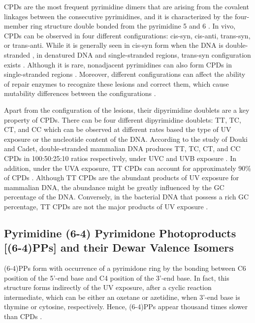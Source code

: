 CPDs are the most frequent pyrimidine dimers that are arising from the covalent linkages between the consecutive pyrimidines, and it is characterized by the four-member ring structure double bonded from the pyrimidine 5 and 6 \citep{whitmore2001effect}. In vivo, CPDs can be observed in four different configurations: cis-syn, cis-anti, trans-syn, or trans-anti. \citep{khattak1972photochemical} While it is generally seen in cis-syn form when the DNA is double-stranded \citep{wacker1964organic}, in denatured DNA and single-stranded regions, trans-syn configuration exists \citep{taylor1988synthesis}. Although it is rare, nonadjacent pyrimidines can also form CPDs in single-stranded regions \citep{nguyen1988ultraviolet}. Moreover, different configurations can affect the ability of repair enzymes to recognize these lesions and correct them, which cause mutability differences between the configurations \citep{friedberg2005dna}. 

Apart from the configuration of the lesions, their dipyrimidine doublets are a key property of CPDs. There can be four different dipyrimidine doublets: TT, TC, CT, and CC which can be observed at different rates based the type of UV exposure or the nucleotide content of the DNA. According to the study of Douki and Cadet, double-stranded mammalian DNA produces TT, TC, CT, and CC CPDs in 100:50:25:10 ratios respectively, under UVC and UVB exposure \citep{douki2001individual}. In addition, under the UVA exposure, TT CPDs can account for approximately 90\% of CPDs \citep{mouret2010uva}. Although TT CPDs are the abundant products of UV exposure for mammalian DNA, the abundance might be greatly influenced by the GC percentage of the DNA. Conversely, in the bacterial DNA that possess a rich GC percentage, TT CPDs are not the major products of UV exposure \citep{patrick1977studies}.

\subsection{Pyrimidine (6-4) Pyrimidone Photoproducts [(6-4)PPs] and their Dewar Valence Isomers}

(6-4)PPs form with occurrence of a pyrimidone ring by the bonding between C6 position of the 5’-end base and C4 position of the 3’-end base. In fact, this structure forms indirectly of the UV exposure, after a cyclic reaction intermediate, which can be either an oxetane or azetidine, when 3’-end base is thymine or cytosine, respectively. Hence, (6-4)PPs appear thousand times slower than CPDs \citep{schreier2007thymine}. 

